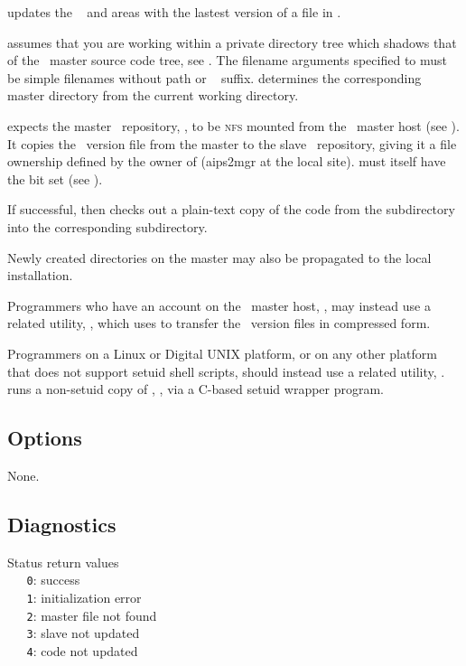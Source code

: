  updates the \aipspp\  and  areas with the
lastest version of a file in .

 assumes that you are working within a private directory tree which
shadows that of the \aipspp\ master source code tree, see .
The filename arguments specified to  must be simple filenames without
path or \rcs\  suffix.   determines the corresponding master
directory from the current working directory.

 expects the master \rcs\ repository, , to be
\textsc{nfs} mounted from the \aipspp\ master host (see
).  It copies the \rcs\ version file from the master to
the slave \rcs\ repository, giving it a file ownership defined by the owner of
 (aips2mgr at the local site).   must itself have the
 bit set (see ).

If successful,  then checks out a plain-text copy of the code from the
 subdirectory into the corresponding 
subdirectory.

Newly created directories on the master may also be propagated to the local
installation.

Programmers who have an account on the \aipspp\ master host,
, may instead use a related utility, , which
uses  to transfer the \rcs\ version files in compressed form.

Programmers on a Linux or Digital UNIX platform, or on any other
platform that does not support setuid shell scripts, should instead use
a related utility, .   runs a non-setuid copy of
, , via a C-based setuid wrapper program.

\subsection*{Options}

None.

\subsection*{Diagnostics}

Status return values
\\ \verb+   0+: success
\\ \verb+   1+: initialization error
\\ \verb+   2+: master file not found
\\ \verb+   3+: slave not updated
\\ \verb+   4+: code not updated

